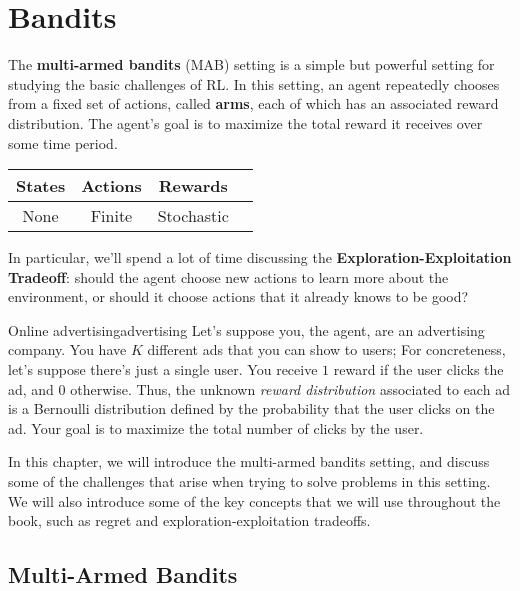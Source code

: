 \documentclass[\main/main]{subfiles}
\begin{document}
\tableofcontents
    
\chapter{Bandits}


The \textbf{multi-armed bandits} (MAB) setting is a simple but powerful setting for studying the basic challenges of RL. In this setting, an agent repeatedly chooses from a fixed set of actions, called \textbf{arms}, each of which has an associated reward distribution. The agent's goal is to maximize the total reward it receives over some time period.

\begin{center}
    \begin{tabular}{|c|c|c|c|}
        \hline
        \textbf{States} & \textbf{Actions} &\textbf{Rewards} \\
        \hline
        None & Finite & Stochastic \\
        \hline
    \end{tabular}
\end{center}

In particular, we'll spend a lot of time discussing the \textbf{Exploration-Exploitation Tradeoff}: should the agent choose new actions to learn more about the environment, or should it choose actions that it already knows to be good?

\begin{example}{Online advertising}{advertising}
    Let's suppose you, the agent, are an advertising company. You have $K$ different ads that you can show to users; For concreteness, let's suppose there's just a single user. You receive $1$ reward if the user clicks the ad, and $0$ otherwise. Thus, the unknown \emph{reward distribution} associated to each ad is a Bernoulli distribution defined by the probability that the user clicks on the ad. Your goal is to maximize the total number of clicks by the user.
\end{example}


In this chapter, we will introduce the multi-armed bandits setting, and discuss some of the challenges that arise when trying to solve problems in this setting. We will also introduce some of the key concepts that we will use throughout the book, such as regret and exploration-exploitation tradeoffs.

\section{Multi-Armed Bandits}
\end{document}
